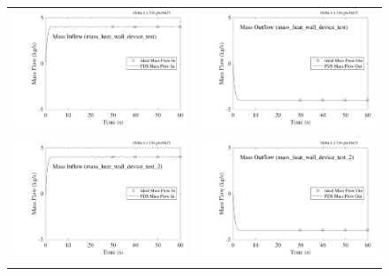 \documentclass[11pt]{book}
\begin{document}
\begin{figure}[p]
\begin{tabular*}{\textwidth}{lr}
\includegraphics[width=3.1in]{SCRIPT_FIGURES/wall_device_test_massflow_in} &
\includegraphics[width=3.1in]{SCRIPT_FIGURES/wall_device_test_massflow_out} \\
\includegraphics[width=3.1in]{SCRIPT_FIGURES/wall_device_test_massflow_in_2} &
\includegraphics[width=3.1in]{SCRIPT_FIGURES/wall_device_test_massflow_out_2} \\

\end{tabular*}
\end{figure}
\end{document}
